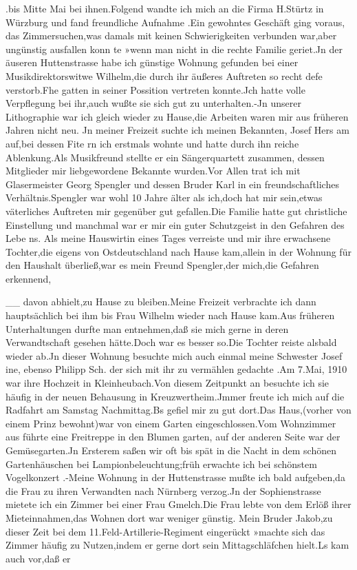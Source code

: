 \documentclass[a4paper,11pt]{article}
\begin{document}
.bis Mitte Mai bei ihnen.Folgend wandte ich mich an die Firma H.Stürtz in Würzburg und fand freundliche Aufnahme .Ein gewohntes Geschäft ging voraus, das Zimmersuchen,was damals mit keinen Schwierigkeiten verbunden war,aber ungünstig ausfallen konn te »wenn man nicht in die rechte Familie geriet.Jn der äuseren Huttenstrasse habe ich günstige Wohnung gefunden bei einer Musikdirektorswitwe Wilhelm,die durch ihr äußeres Auftreten so recht defe verstorb.Fhe gatten in seiner Possition vertreten konnte.Jch hatte volle Verpflegung bei ihr,auch wußte sie sich gut zu unterhalten.-Jn unserer Lithographie war ich gleich wieder zu Hause,die Arbeiten waren mir aus früheren Jahren nicht neu. Jn meiner Freizeit suchte ich meinen Bekannten, Josef Hers am auf,bei dessen Fite rn ich erstmals wohnte und hatte durch ihn reiche Ablenkung.Als Musikfreund stellte er ein Sängerquartett zusammen, dessen Mitglieder mir liebgewordene Bekannte wurden.Vor Allen trat ich mit Glasermeister Georg Spengler und dessen Bruder Karl in ein freundschaftliches Verhältnis.Spengler war wohl 10 Jahre älter als ich,doch hat mir sein,etwas väterliches Auftreten mir gegenüber gut gefallen.Die Familie hatte gut christliche Einstellung und manchmal war er mir ein guter Schutzgeist in den Gefahren des Lebe ns. Als meine Hauswirtin eines Tages verreiste und mir ihre erwachsene Tochter,die eigens von Ostdeutschland nach Hause kam,allein in der Wohnung für den Haushalt überließ,war es mein Freund Spengler,der mich,die Gefahren erkennend,

__ davon abhielt,zu Hause zu bleiben.Meine Freizeit verbrachte ich dann hauptsächlich bei ihm bis Frau Wilhelm wieder nach Hause kam.Aus früheren Unterhaltungen durfte man entnehmen,daß sie mich gerne in deren Verwandtschaft gesehen hätte.Doch war es besser so.Die Tochter reiste alsbald wieder ab.Jn dieser Wohnung besuchte mich auch einmal meine Schwester Josef ine, ebenso Philipp Sch. der sich mit ihr zu vermählen gedachte .Am 7.Mai, 1910 war ihre Hochzeit in Kleinheubach.Von diesem Zeitpunkt an besuchte ich sie häufig in der neuen Behausung in Kreuzwertheim.Jmmer freute ich mich auf die Radfahrt am Samstag Nachmittag.Bs gefiel mir zu gut dort.Das Haus,(vorher von einem Prinz bewohnt)war von einem Garten eingeschlossen.Vom Wohnzimmer aus führte eine Freitreppe in den Blumen garten, auf der anderen Seite war der Gemüsegarten.Jn Ersterem saßen wir oft bis spät in die Nacht in dem schönen Gartenhäuschen bei Lampionbeleuchtung;früh erwachte ich bei schönstem Vogelkonzert .-Meine Wohnung in der Huttenstrasse mußte ich bald aufgeben,da die Frau zu ihren Verwandten nach Nürnberg verzog.Jn der Sophienstrasse mietete ich ein Zimmer bei einer Frau Gmelch.Die Frau lebte von dem Erlöß ihrer Mieteinnahmen,das Wohnen dort war weniger günstig. Mein Bruder Jakob,zu dieser Zeit bei dem 11.Feld-Artillerie-Regiment eingerückt »machte sich das Zimmer häufig zu Nutzen,indem er gerne dort sein Mittagschläfchen hielt.Ls kam auch vor,daß er
\end{document}
